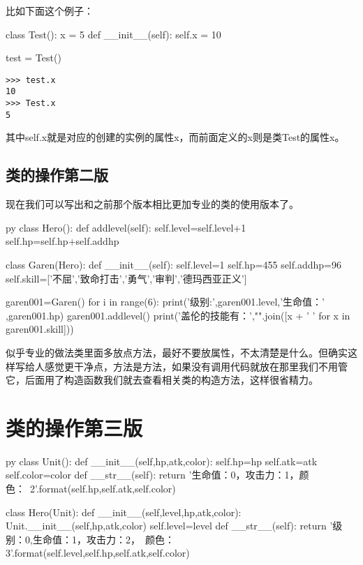 \documentclass[12pt,oneside]{book}
\begin{document}
\begin{common-format}
比如下面这个例子：
\begin{tcbpython}[]
class Test():
    x = 5
    def __init__(self):
        self.x = 10

test = Test()
\end{tcbpython}
\begin{Verbatim}
>>> test.x
10
>>> Test.x
5
\end{Verbatim}

其中self.x就是对应的创建的实例的属性x，而前面定义的x则是类Test的属性x。

\subsection{类的操作第二版}
现在我们可以写出和之前那个版本相比更加专业的类的使用版本了。
\begin{xverbatim}[129]{py}
class Hero():
    def addlevel(self):
        self.level=self.level+1
        self.hp=self.hp+self.addhp

class Garen(Hero):
    def __init__(self):
        self.level=1
        self.hp=455
        self.addhp=96
        self.skill=['不屈','致命打击','勇气','审判','德玛西亚正义']

garen001=Garen()
for i in range(6):
    print('级别:',garen001.level,'生命值：' ,garen001.hp)
    garen001.addlevel()
print('盖伦的技能有：',"".join([x + '  ' for x in garen001.skill]))
\end{xverbatim}

似乎专业的做法类里面多放点方法，最好不要放属性，不太清楚是什么。但确实这样写给人感觉更干净点，方法是方法，如果没有调用代码就放在那里我们不用管它，后面用了构造函数我们就去查看相关类的构造方法，这样很省精力。


\section{类的操作第三版}
\label{sec:类的操作第三版}
\begin{xverbatim}[129]{py}
class Unit():
    def __init__(self,hp,atk,color):
        self.hp=hp
        self.atk=atk
        self.color=color
    def __str__(self):
        return '生命值：{0}，攻击力：{1}，颜色：\
        {2}'.format(self.hp,self.atk,self.color)

class Hero(Unit):
    def __init__(self,level,hp,atk,color):
        Unit.__init__(self,hp,atk,color)
        self.level=level
    def __str__(self):
        return '级别：{0},生命值：{1}，攻击力：{2}，\
        颜色：{3}'.format(self.level,self.hp,self.atk,self.color)


\end{xverbatim}
\end{common-format}
\end{document}
